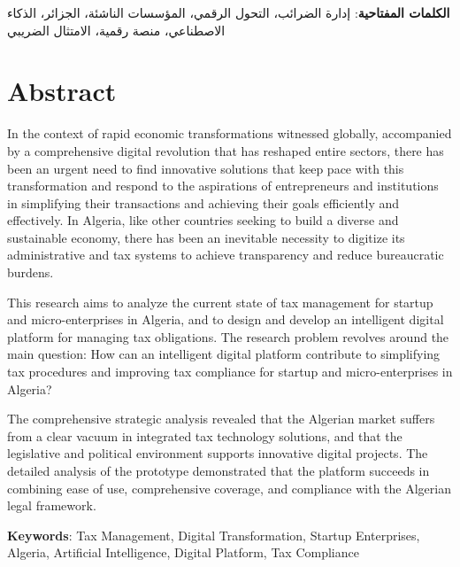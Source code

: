 \documentclass[12pt, a4paper, twoside]{report}
\begin{document}
\vspace{6pt}
\noindent
\textbf{الكلمات المفتاحية}: إدارة الضرائب، التحول الرقمي، المؤسسات الناشئة، الجزائر، الذكاء الاصطناعي، منصة رقمية، الامتثال الضريبي

\newpage

\chapter*{Abstract}

In the context of rapid economic transformations witnessed globally, accompanied by a comprehensive digital revolution that has reshaped entire sectors, there has been an urgent need to find innovative solutions that keep pace with this transformation and respond to the aspirations of entrepreneurs and institutions in simplifying their transactions and achieving their goals efficiently and effectively. In Algeria, like other countries seeking to build a diverse and sustainable economy, there has been an inevitable necessity to digitize its administrative and tax systems to achieve transparency and reduce bureaucratic burdens.

This research aims to analyze the current state of tax management for startup and micro-enterprises in Algeria, and to design and develop an intelligent digital platform for managing tax obligations. The research problem revolves around the main question: How can an intelligent digital platform contribute to simplifying tax procedures and improving tax compliance for startup and micro-enterprises in Algeria?

The comprehensive strategic analysis revealed that the Algerian market suffers from a clear vacuum in integrated tax technology solutions, and that the legislative and political environment supports innovative digital projects. The detailed analysis of the prototype demonstrated that the platform succeeds in combining ease of use, comprehensive coverage, and compliance with the Algerian legal framework.

\vspace{6pt}
\noindent
\textbf{Keywords}: Tax Management, Digital Transformation, Startup Enterprises, Algeria, Artificial Intelligence, Digital Platform, Tax Compliance

\newpage

\tableofcontents
\newpage

\listoffigures
{}
\newpage
\end{document}
